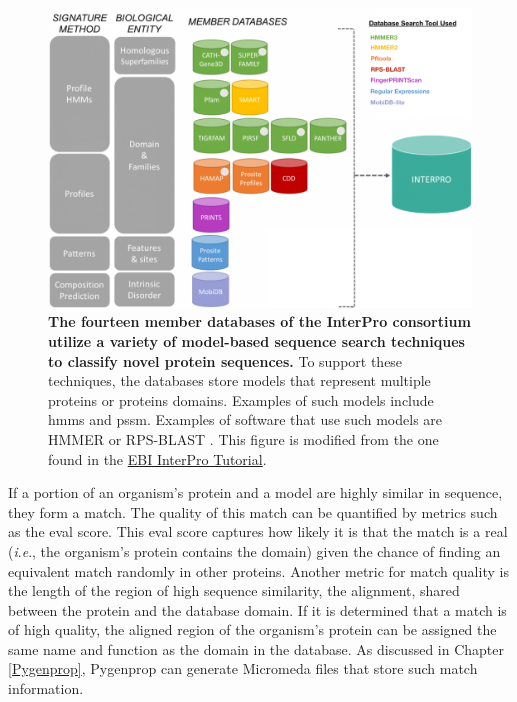 \begin{figure}[!ht]
  \centering
	\includegraphics[width=\textwidth]{media/InterPro.png}
	 \caption[The fourteen member databases of the InterPro consortium utilize a 
variety of model-based sequence search techniques to classify novel protein 
sequences.]{\textbf{The fourteen member databases of the InterPro consortium 
utilize a variety of model-based sequence search techniques to classify novel 
protein sequences.} To support these techniques, the databases store models that 
represent multiple proteins or proteins domains. Examples of such models include 
\gls{hmm}s and \gls{pssm}. Examples of software that use such models are HMMER 
\cite{eddy2011accelerated} or RPS-BLAST \cite{mcginnis2004blast}. This figure is 
modified from the one found in the 
\href{https://www.ebi.ac.uk/training/online/course/introduction-protein-classification-ebi/protein-classification-resources-ebi-interpro}{EBI 
InterPro Tutorial}.}
	 \label{fig:interpro-databases}
\end{figure}

If a portion of an organism's protein and a model are highly similar in 
sequence, they form a match. The quality of this match can be quantified by 
metrics such as the \gls{eval} score. This \gls{eval} score captures how likely 
it is that the match is a real (\textit{i}.\textit{e}., the organism's protein contains the 
domain) given the chance of finding an equivalent match randomly in other 
proteins. Another metric for match quality is the length of the region of high 
sequence similarity, the alignment, shared between the protein and the database 
domain. If it is determined that a match is of high quality, the aligned region 
of the organism's protein can be assigned the same name and function as the 
domain in the database.  As discussed in Chapter \ref{Pygenprop}, Pygenprop can 
generate Micromeda files that store such match information.

